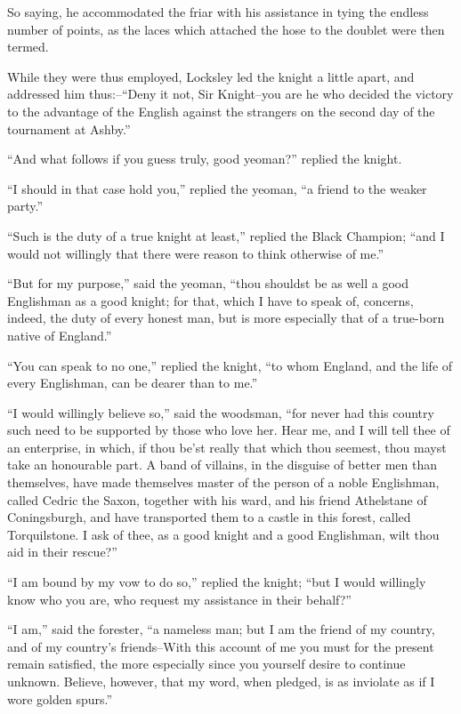 So saying, he accommodated the friar with his assistance in tying the
endless number of points, as the laces which attached the hose to the
doublet were then termed.

While they were thus employed, Locksley led the knight a little apart,
and addressed him thus:--``Deny it not, Sir Knight--you are he who
decided the victory to the advantage of the English against the
strangers on the second day of the tournament at Ashby.''

``And what follows if you guess truly, good yeoman?'' replied the
knight.

``I should in that case hold you,'' replied the yeoman, ``a friend to
the weaker party.''

``Such is the duty of a true knight at least,'' replied the Black
Champion; ``and I would not willingly that there were reason to think
otherwise of me.''

``But for my purpose,'' said the yeoman, ``thou shouldst be as well a
good Englishman as a good knight; for that, which I have to speak of,
concerns, indeed, the duty of every honest man, but is more especially
that of a true-born native of England.''

``You can speak to no one,'' replied the knight, ``to whom England, and
the life of every Englishman, can be dearer than to me.''

``I would willingly believe so,'' said the woodsman, ``for never had
this country such need to be supported by those who love her. Hear me,
and I will tell thee of an enterprise, in which, if thou be'st really
that which thou seemest, thou mayst take an honourable part. A band of
villains, in the disguise of better men than themselves, have made
themselves master of the person of a noble Englishman, called Cedric the
Saxon, together with his ward, and his friend Athelstane of
Coningsburgh, and have transported them to a castle in this forest,
called Torquilstone. I ask of thee, as a good knight and a good
Englishman, wilt thou aid in their rescue?''

``I am bound by my vow to do so,'' replied the knight; ``but I would
willingly know who you are, who request my assistance in their behalf?''

``I am,'' said the forester, ``a nameless man; but I am the friend of my
country, and of my country's friends--With this account of me you must
for the present remain satisfied, the more especially since you yourself
desire to continue unknown. Believe, however, that my word, when
pledged, is as inviolate as if I wore golden spurs.''

